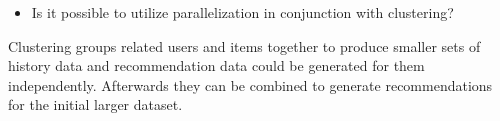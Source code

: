 \begin{itemize}
        \begin{itemize}
            \item Is it possible to utilize parallelization in conjunction with clustering?
        \end{itemize}

        Clustering groups related users and items together to produce smaller sets of history data and recommendation data could be generated for them independently. Afterwards they can be combined to generate recommendations for the initial larger dataset.


\end{itemize}


